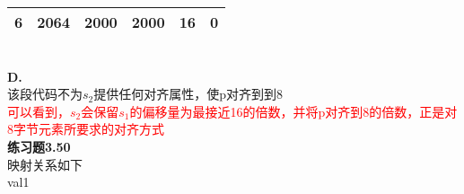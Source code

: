 \documentclass{article}
\newcommand{\red}[1]{\textcolor{red}{#1}}
\begin{document}
\begin{CJK}{UTF8}{uyhei}
\begin{table}[htbp]
\begin{tabular}{|m{6em}<{\centering}m{6em}<{\centering}m{6em}<{\centering}m{6em}<{\centering}m{6em}<{\centering}m{6em}<{\centering}|}
6	&	2064	&	2000	&	2000	&	16	&	0	\\
\hline
\end{tabular}
\end{table}	\\[2ex]
\textbf{D.}	\\
该段代码不为$s_2$提供任何对齐属性，使p对齐到到8	\\
\red{可以看到，$s_2$会保留$s_1$的偏移量为最接近16的倍数，并将p对齐到8的倍数，正是对8字节元素所要求的对齐方式}	\\[3ex]
\textbf{练习题3.50}	\\
映射关系如下	\\
val1







\end{CJK}
\end{document}
